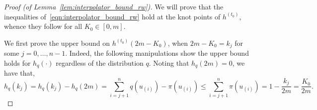\documentclass{article}
\newcommand{\1}{\mathbf{1}}
\theoremstyle{definition}
\theoremstyle{remark}
\begin{document}
\begin{proof}[Proof (of Lemma~\ref{lem:interpolator_bound_rw})]
	We will prove that the inequalities of~\eqref{eqn:interpolator_bound_rw} hold at the knot points of $h^{(t_0)}$, whence they follow for all $K_0 \in [0,m]$. 
	
	We first prove the upper bound on $h^{(t_0)}(2m - K_0)$, when $2m - K_0 = k_j$ for some $j = 0,\ldots,n - 1$. Indeed, the following manipulations show the upper bound holds for $h_q(\cdot)$ regardless of the distribution $q$. Noting that $h_q(2m) = 0$, we have that,
	\begin{equation*}
	h_q(k_j) = h_q(k_j) - h_q(2m) = \sum_{i = j + 1}^{n} q(u_{(i)}) - \pi(u_{(i)}) \leq \sum_{i = j + 1}^{n} \pi(u_{(i)}) = 1 - \frac{k_j}{2m} = \frac{K_0}{2m}.
	\end{equation*}
	

\end{proof}
\end{document}
